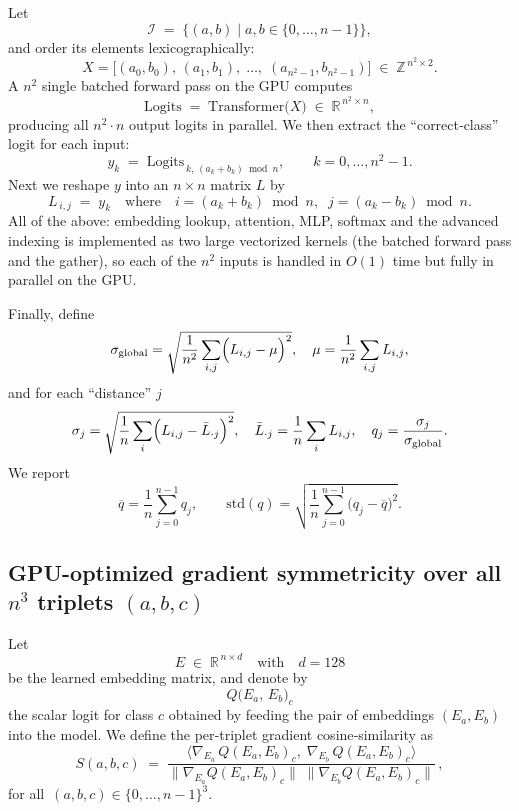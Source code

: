 \documentclass{article} %
\theoremstyle{plain}
\theoremstyle{definition}
\newtheorem{empirical fact}[theorem]{Empirical Fact}
\begin{document}
Let
\[
\mathcal{I} \;=\;\bigl\{(a,b)\mid a,b\in\{0,\dots,n-1\}\bigr\},
\]
and order its elements lexicographically:
\[
X = \bigl[(a_0,b_0),\,(a_1,b_1),\;\dots,\;(a_{n^2-1},b_{n^2-1})\bigr]
\;\in\;\mathbb{Z}^{\,n^2\times2}.
\]
A $n^2$ single batched forward pass on the GPU computes
\[
\mathrm{Logits}
\;=\;
\mathrm{Transformer}\bigl(X\bigr)
\;\in\;\mathbb{R}^{\,n^2\times n},
\]
producing all \(n^2\cdot n\) output logits in parallel.  We then extract the “correct‐class” logit for each input:
\[
y_k
\;=\;
\mathrm{Logits}_{\,k,\,(a_k + b_k)\bmod n},
\qquad
k = 0,\dots,n^2-1.
\]
Next we reshape \(y\) into an \(n\times n\) matrix \(L\) by
\[
L_{\,i,j}
\;=\;
y_k
\quad\text{where}\quad
i = (a_k + b_k)\bmod n,
\;\;
j = (a_k - b_k)\bmod n.
\]
All of the above: embedding lookup, attention, MLP, softmax and the advanced indexing is implemented as two large vectorized kernels (the batched forward pass and the gather), so each of the \(n^2\) inputs is handled in \(O(1)\) time but fully in parallel on the GPU.

Finally, define
\[
\sigma_{\rm global}
=\sqrt{\frac{1}{n^2}\sum_{i,j}\Bigl(L_{i,j}-\mu\Bigr)^2},
\quad
\mu=\frac{1}{n^2}\sum_{i,j}L_{i,j},
\]
and for each “distance” \(j\)
\[
\sigma_j
=\sqrt{\frac{1}{n}\sum_{i}\Bigl(L_{i,j}-\bar L_{\cdot j}\Bigr)^2},
\quad
\bar L_{\cdot j}=\frac{1}{n}\sum_{i}L_{i,j},
\quad
q_j=\frac{\sigma_j}{\sigma_{\rm global}}.
\]
We report
\[
\overline{q}
=\frac{1}{n}\sum_{j=0}^{n-1}q_j,
\qquad
\mathrm{std}(q)
=\sqrt{\frac{1}{n}\sum_{j=0}^{n-1}\bigl(q_j-\overline{q}\bigr)^2}.
\]



\subsection{GPU-optimized gradient symmetricity over all $n^3$ triplets $(a,b,c)$}

Let
\[
E \;\in\;\mathbb{R}^{\,n\times d}
\quad\text{with}\quad d=128
\]
be the learned embedding matrix, and denote by
\[
Q\bigl(E_a,\,E_b\bigr)_c
\]
the scalar logit for class \(c\) obtained by feeding the pair of embeddings
\((E_a,E_b)\) into the model.  We define the per‑triplet gradient cosine‑similarity
as
\[
S(a,b,c)
\;=\;
\frac{\bigl\langle \nabla_{E_a}\,Q(E_a,E_b)_c,\;\nabla_{E_b}\,Q(E_a,E_b)_c\bigr\rangle}
     {\bigl\|\nabla_{E_a}Q(E_a,E_b)_c\bigr\|\;\bigl\|\nabla_{E_b}Q(E_a,E_b)_c\bigr\|}\,,
\]
for all 
\(\,(a,b,c)\in\{0,\dots,n-1\}^3\).
\end{document}
